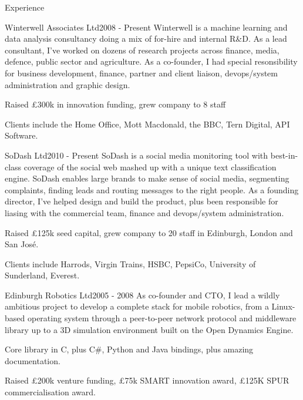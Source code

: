 \documentclass{resume} %
\begin{document}
\begin{rSection}{Experience}

\begin{rSubsection}{Winterwell Associates Ltd}{2008 - Present}
{Winterwell is a machine learning and data analysis consultancy doing a mix of for-hire and internal R\&D.
As a lead consultant, I've worked on dozens of research projects across finance, media, defence, public sector and 
agriculture. As a co-founder, I had special resonsibility for business development, finance, partner and client liaison, devops/system administration and graphic design.}{}
\item Raised £300k in innovation funding, grew company to 8 staff
\item Clients include the Home Office, Mott Macdonald, the BBC, Tern Digital, API Software.
\end{rSubsection}


\begin{rSubsection}{SoDash Ltd}{2010 - Present}
{SoDash is a social media monitoring tool with best-in-class coverage of the social web
mashed up with a unique text classification engine. SoDash enables large brands to make sense of
social media, segmenting complaints, finding leads and routing messages to the right people.
As a founding director, I've helped design and build the product, plus been responsible for liasing with the commercial team,
finance and devops/system administration.}{}
\item Raised £125k seed capital, grew company to 20 staff in Edinburgh, London and San José.
\item Clients include Harrods, Virgin Trains, HSBC, PepsiCo, University of Sunderland, Everest.
\end{rSubsection}


\begin{rSubsection}{Edinburgh Robotics Ltd}{2005 - 2008}
{As co-founder and CTO, I lead a wildly ambitious project to develop a complete stack for mobile robotics,
from a Linux-based operating system through a peer-to-peer network protocol and middleware library up to a 3D
simulation environment built on the Open Dynamics Engine.}{} 
\item Core library in C, plus C\#, Python and Java bindings, plus amazing documentation.
\item Raised £200k venture funding, £75k SMART innovation award, £125K SPUR commercialisation award.
\end{rSubsection}


\end{rSection}
\end{document}
